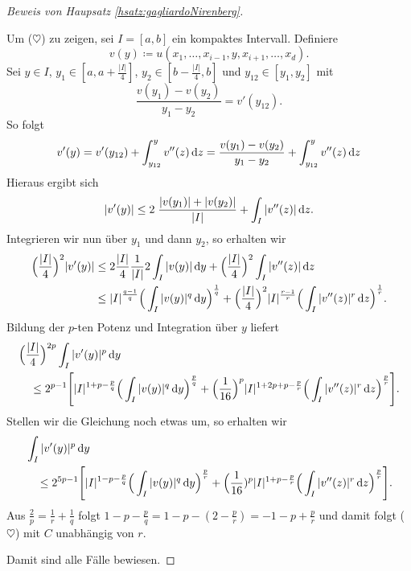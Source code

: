 \begin{proof}[Beweis von Haupsatz \ref{hsatz:gagliardoNirenberg}]
\begin{enumerate}
      Um ($\heartsuit$) zu zeigen, sei $I = [a,b]$ ein kompaktes Intervall.
      Definiere
      $$
      v(y) \coloneqq u(x_1,\dots,x_{i - 1},y,x_{i + 1},\dots,x_d).
      $$
      Sei $y \in I$, $y_1 \in [a,a + \frac{|I|}{4}]$, $y_2 \in [b - \frac{|I|}{4}, b]$ und $y_{12} \in [y_1, y_2]$ mit
      $$
      \frac{v(y_1) - v(y_2)}{y_1 - y_2} = v'(y_{12}).
      $$
      So folgt
      $$
      v'(y) 
      = v'(y_{12}) + \int_{y_{12}}^y v''(z) \, {\operatorname{d}\!{z}}
      = \frac{v(y_1) - v(y_2)}{y_1 - y_2} + \int_{y_{12}}^y v''(z) \, {\operatorname{d}\!{z}}
      $$
      Hieraus ergibt sich
      $$
      |v'(y)| \leq 2\; \frac{|v(y_1)| + |v(y_2)|}{|I|} + \int_I |v''(z)| \, {\operatorname{d}\!{z}}.
      $$
      Integrieren wir nun über $y_1$ und dann $y_2$, so erhalten wir
      \begin{align*}
        \Big( \frac{|I|}{4} \Big)^2 |v'(y)|
        &\leq 2 \frac{|I|}{4} \frac{1}{|I|} 2 \int_I |v(y)| \, {\operatorname{d}\!{y}} + \Big( \frac{|I|}{4}\Big)^2 \int_I |v''(z)| \, {\operatorname{d}\!{z}} \\
        &\leq |I|^{\frac{q - 1}{q}} \Big( \int_I |v(y)|^q \, {\operatorname{d}\!{y}} \Big)^{\frac{1}{q}} + \Big( \frac{|I|}{4} \Big)^2 |I|^{\frac{r - 1}{r}} \Big( \int_I |v''(z)|^r \, {\operatorname{d}\!{z}} \Big)^{\frac{1}{r}}.
      \end{align*}
      Bildung der $p$-ten Potenz und Integration über $y$ liefert
      \begin{align*}
        &\Big(\frac{|I|}{4}\Big)^{2p} \int_I |v'(y)|^p \, {\operatorname{d}\!{y}}\\  
        &\quad\leq 2^{p - 1} \Bigg[ |I|^{1 + p - \frac{p}{q}} \Big( \int_I |v(y)|^q \, {\operatorname{d}\!{y}} \Big)^{\frac{p}{q}} + \Big(\frac{1}{16}\Big)^p |I|^{1 + 2p + p - \frac{p}{r}} \Big(\int_I |v''(z)|^r \, {\operatorname{d}\!{z}} \Big)^{\frac{p}{r}} \Bigg].
      \end{align*}
      Stellen wir die Gleichung noch etwas um, so erhalten wir
      \begin{align*}
        &\int_I |v'(y)|^p \, {\operatorname{d}\!{y}}  \\
        &\quad \leq 2^{5p - 1} \Bigg[ |I|^{1 - p - \frac{p}{q}} \Big( \int_I |v(y)|^q \, {\operatorname{d}\!{y}} \Big)^{\frac{p}{r}} + \Big(\frac{1}{16})^p |I|^{1 + p - \frac{p}{r}} \Big( \int_I |v''(z)|^r \, {\operatorname{d}\!{z}} \Big)^{\frac{p}{r}} \Bigg].
      \end{align*}
      Aus $\frac{2}{p} = \frac{1}{r} + \frac{1}{q}$ folgt $1 - p - \frac{p}{q} = 1 - p - (2 - \frac{p}{r}) = -1 - p + \frac{p}{r}$ und damit folgt ($\heartsuit$) mit $C$ unabhängig von $r$.
\end{enumerate}
Damit sind alle Fälle bewiesen.
\end{proof}

